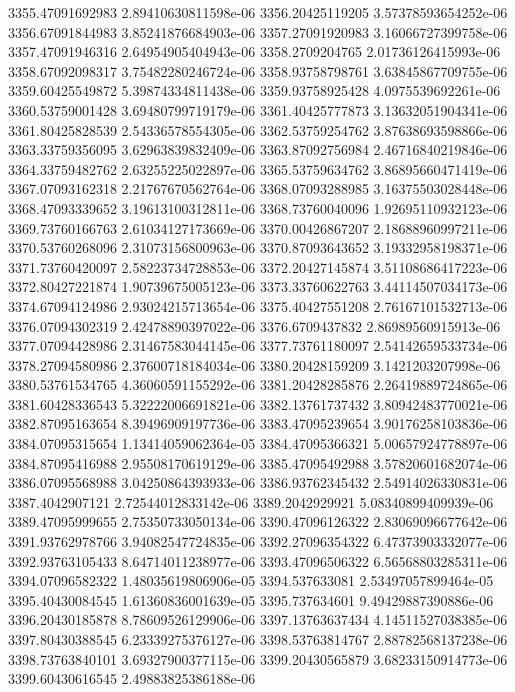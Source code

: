 {3355.47091692983 2.89410630811598e-06
3356.20425119205 3.57378593654252e-06
3356.67091844983 3.85241876684903e-06
3357.27091920983 3.16066727399758e-06
3357.47091946316 2.64954905404943e-06
3358.2709204765 2.01736126415993e-06
3358.67092098317 3.75482280246724e-06
3358.93758798761 3.63845867709755e-06
3359.60425549872 5.39874334811438e-06
3359.93758925428 4.0975539692261e-06
3360.53759001428 3.69480799719179e-06
3361.40425777873 3.13632051904341e-06
3361.80425828539 2.54336578554305e-06
3362.53759254762 3.87638693598866e-06
3363.33759356095 3.62963839832409e-06
3363.87092756984 2.46716840219846e-06
3364.33759482762 2.63255225022897e-06
3365.53759634762 3.86895660471419e-06
3367.07093162318 2.21767670562764e-06
3368.07093288985 3.16375503028448e-06
3368.47093339652 3.19613100312811e-06
3368.73760040096 1.92695110932123e-06
3369.73760166763 2.61034127173669e-06
3370.00426867207 2.18688960997211e-06
3370.53760268096 2.31073156800963e-06
3370.87093643652 3.19332958198371e-06
3371.73760420097 2.58223734728853e-06
3372.20427145874 3.51108686417223e-06
3372.80427221874 1.90739675005123e-06
3373.33760622763 3.44114507034173e-06
3374.67094124986 2.93024215713654e-06
3375.40427551208 2.76167101532713e-06
3376.07094302319 2.42478890397022e-06
3376.6709437832 2.86989560915913e-06
3377.07094428986 2.31467583044145e-06
3377.73761180097 2.54142659533734e-06
3378.27094580986 2.37600718184034e-06
3380.20428159209 3.1421203207998e-06
3380.53761534765 4.36060591155292e-06
3381.20428285876 2.26419889724865e-06
3381.60428336543 5.32222006691821e-06
3382.13761737432 3.80942483770021e-06
3382.87095163654 8.39496909197736e-06
3383.47095239654 3.90176258103836e-06
3384.07095315654 1.13414059062364e-05
3384.47095366321 5.00657924778897e-06
3384.87095416988 2.95508170619129e-06
3385.47095492988 3.57820601682074e-06
3386.07095568988 3.04250864393933e-06
3386.93762345432 2.54914026330831e-06
3387.4042907121 2.72544012833142e-06
3389.2042929921 5.08340899409939e-06
3389.47095999655 2.75350733050134e-06
3390.47096126322 2.83069096677642e-06
3391.93762978766 3.94082547724835e-06
3392.27096354322 6.47373903332077e-06
3392.93763105433 8.64714011238977e-06
3393.47096506322 6.56568803285311e-06
3394.07096582322 1.48035619806906e-05
3394.537633081 2.53497057899464e-05
3395.40430084545 1.61360836001639e-05
3395.737634601 9.49429887390886e-06
3396.20430185878 8.78609526129906e-06
3397.13763637434 4.14511527038385e-06
3397.80430388545 6.23339275376127e-06
3398.53763814767 2.88782568137238e-06
3398.73763840101 3.69327900377115e-06
3399.20430565879 3.68233150914773e-06
3399.60430616545 2.49883825386188e-06
}

